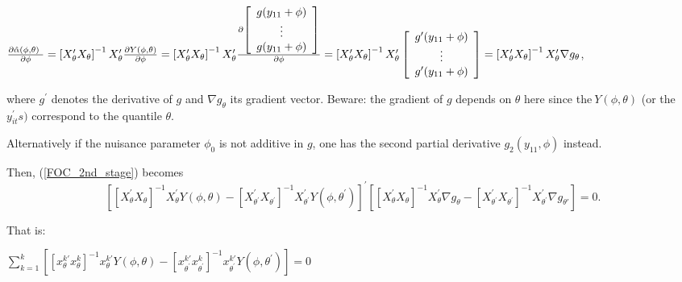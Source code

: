 \documentclass[a4paper,notitlepage,thmsb,11pt]{article}
\begin{document}
$\frac{\partial \hat{\alpha}(\phi ,\theta )~}{\partial \phi }=\left[
X_{\theta }^{\prime }X_{\theta }\right] ^{-1}X_{\theta }^{\prime }\frac{%
\partial Y(\phi ,\theta )}{\partial \phi }=\left[ X_{\theta }^{\prime
}X_{\theta }\right] ^{-1}X_{\theta }^{\prime }\frac{\partial \left[ 
\begin{array}{c}
g(y_{11}+\phi ) \\ 
\vdots  \\ 
g(y_{11}+\phi )%
\end{array}%
\right] }{\partial \phi }=\left[ X_{\theta }^{\prime }X_{\theta }\right]
^{-1}X_{\theta }^{\prime }\left[ 
\begin{array}{c}
g^{\prime }(y_{11}+\phi ) \\ 
\vdots  \\ 
g^{\prime }(y_{11}+\phi )%
\end{array}%
\right] =\left[ X_{\theta }^{\prime }X_{\theta }\right] ^{-1}X_{\theta
}^{\prime }\nabla g_{\theta }$,

where $g^{\prime }$ denotes the derivative of $g$ and $\nabla g_{\theta }$
its gradient vector. Beware: the gradient of $g$ depends on $\theta $ here
since the$\ Y(\phi ,\theta )$ (or the $y_{it}^{\prime }s)$ correspond to the
quantile $\theta $.

Alternatively if the nuisance parameter $\phi _{0}$ is not additive in $g$,
one has the second partial derivative $g_{2}(y_{11},\phi )$ instead.

\bigskip

Then, (\ref{FOC_2nd_stage}) becomes%
\begin{equation}
\left[ \left[ X_{\theta }^{\prime }X_{\theta }\right] ^{-1}X_{\theta
}^{\prime }Y(\phi ,\theta )-\left[ X_{\theta ^{\prime }}^{\prime }X_{\theta
^{\prime }}\right] ^{-1}X_{\theta ^{\prime }}^{\prime }Y(\phi ,\theta
^{\prime })\right] ^{\prime }\left[ \left[ X_{\theta }^{\prime }X_{\theta }%
\right] ^{-1}X_{\theta }^{\prime }\nabla g_{\theta }-\left[ X_{\theta
^{\prime }}^{\prime }X_{\theta ^{\prime }}\right] ^{-1}X_{\theta ^{\prime
}}^{\prime }\nabla g_{\theta \prime }\right] =0.  \label{2FOC_MAT}
\end{equation}

That is:

$\sum\limits_{k=1}^{k}\left[ \left[ x_{\theta }^{k\prime }x_{\theta }^{k}%
\right] ^{-1}x_{\theta }^{k\prime }Y(\phi ,\theta )-\left[ x_{\theta
^{\prime }}^{k\prime }x_{\theta ^{\prime }}^{k}\right] ^{-1}x_{\theta
^{\prime }}^{k\prime }Y(\phi ,\theta ^{\prime })\right] =0$
\end{document}
